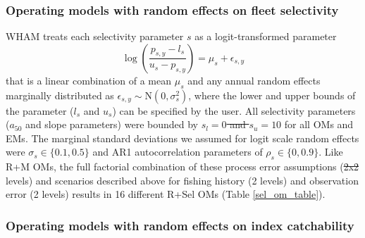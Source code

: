 \documentclass[
  12pt,
]{article}
\makeatletter
\providecommand{\DIFadd}[1]{{\protect\color{blue}\uwave{#1}}} %
\providecommand{\DIFdel}[1]{{\protect\color{red}\sout{#1}}} %
\providecommand{\DIFaddbegin}{} %
\providecommand{\DIFaddend}{} %
\providecommand{\DIFdelbegin}{} %
\providecommand{\DIFdelend}{} %
\providecommand{\DIFscaledelfig}{0.5}
\newlength{\DIFdelgraphicswidth} %
\newlength{\DIFdelgraphicsheight} %
\providecommand{\DIFaddincludegraphics}[2][]{{\color{blue}\fbox{\DIFOincludegraphics[#1]{#2}}}} %
\providecommand{\DIFdelincludegraphics}[2][]{%
\sbox{\DIFdelgraphicsbox}{\DIFOincludegraphics[#1]{#2}}%
\settoboxwidth{\DIFdelgraphicswidth}{\DIFdelgraphicsbox} %
\settoboxtotalheight{\DIFdelgraphicsheight}{\DIFdelgraphicsbox} %
\scalebox{\DIFscaledelfig}{%
\parbox[b]{\DIFdelgraphicswidth}{\usebox{\DIFdelgraphicsbox}\\[-\baselineskip] \rule{\DIFdelgraphicswidth}{0em}}\llap{\resizebox{\DIFdelgraphicswidth}{\DIFdelgraphicsheight}{%
\setlength{\unitlength}{\DIFdelgraphicswidth}%
\begin{picture}(1,1)%
\thicklines\linethickness{2pt} %
{\color[rgb]{1,0,0}\put(0,0){\framebox(1,1){}}}%
{\color[rgb]{1,0,0}\put(0,0){\line( 1,1){1}}}%
{\color[rgb]{1,0,0}\put(0,1){\line(1,-1){1}}}%
\end{picture}%
}\hspace*{3pt}}} %
} %
\DeclareRobustCommand{\DIFaddbegin}{\DIFOaddbegin \let\includegraphics\DIFaddincludegraphics} %
\DeclareRobustCommand{\DIFaddend}{\DIFOaddend \let\includegraphics\DIFOincludegraphics} %
\DeclareRobustCommand{\DIFdelbegin}{\DIFOdelbegin \let\includegraphics\DIFdelincludegraphics} %
\DeclareRobustCommand{\DIFdelend}{\DIFOaddend \let\includegraphics\DIFOincludegraphics} %
\let\sout@orig\sout %
\renewcommand{\sout}[1]{\ifmmode\text{\sout@orig{\ensuremath{#1}}}\else\sout@orig{#1}\fi} %
\makeatother
\begin{document}
\subsubsection*{Operating models with random effects on fleet
selectivity}\label{operating-models-with-random-effects-on-fleet-selectivity}

WHAM treats each selectivity parameter \(s\) as a logit-transformed
parameter \[
\log\left(\frac{p_{s,y}-l_{s}}{u_{s}-p_{s,y}}\right) = \mu_s + \epsilon_{s,y}
\] that is a linear combination of a mean \(\mu_s\) and any annual
random effects marginally distributed as
\(\epsilon_{s,y} \sim \text{N}\left(0,\sigma_s^2\right)\), where the
lower and upper bounds of the parameter (\(l_s\) and \(u_s\)) can be
specified by the user. All selectivity parameters (\(a_{50}\) and slope
parameters) were bounded by \DIFdelbegin \DIFdel{\(s_l = 0\) and \(s_u = 10\) }\DIFdelend \DIFaddbegin \DIFadd{\(l_s = 0\) and \(u_s = 10\) }\DIFaddend for all OMs and
EMs. The marginal standard deviations we assumed for logit scale random
effects were \(\sigma_s \in \{0.1, 0.5\}\) and AR1 autocorrelation
parameters of \(\rho_s \in \{0,0.9\}\). Like R+M OMs, the full factorial
combination of these process error assumptions (\DIFdelbegin \DIFdel{2x2 }\DIFdelend \DIFaddbegin \DIFadd{\(2\times2\) }\DIFaddend levels) and
scenarios described above for fishing history (2 levels) and observation
error (2 levels) results in 16 different R+Sel OMs (Table
\ref{sel_om_table}).

\subsubsection*{Operating models with random effects on index
catchability}\label{operating-models-with-random-effects-on-index-catchability}
\end{document}
